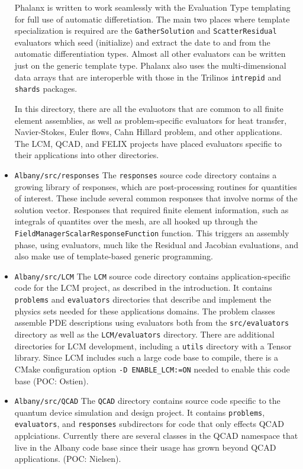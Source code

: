 \documentclass[pdf,12pt,report,strict]{SANDreport}
\theoremstyle{remark}
\begin{document}
\begin{itemize}
Phalanx is written to work seamlessly with the Evaluation Type templating for full
use of automatic differetiation. The main two places where template specialization is
required are the \texttt{GatherSolution} and \texttt{ScatterResidual} evaluators which
seed (initialize) and extract the date to and from the automatic differentiation types.
Almost all other evaluators can be written just on the generic template type.
Phalanx also uses the multi-dimensional data arrays that are interoperble with those in the
Trilinos \texttt{intrepid} and \texttt{shards} packages.

In this directory, there are all the evaluotors that are common to all finite element
assemblies, as well as problem-specific evaluators for heat transfer, Navier-Stokes, 
Euler flows, Cahn Hillard problem, and other applications. The LCM, QCAD, and
FELIX projects have placed evaluators specific to their applications into 
other directories.

\item{\texttt{Albany/src/responses}}  The \texttt{responses} source code directory contains
a growing library of responses, which are post-processing routines for quantities of interest.
These include several common responses that involve norms of the solution vector. 
Responses that required finite element information, such as integrals of quantites
over the mesh, are all hooked up through the
\texttt{FieldManagerScalarResponseFunction} function. This triggers an assembly
phase, using evaluators, much like the Residual and Jacobian evaluations, and 
also make use of template-based generic programming.

\item{\texttt{Albany/src/LCM}}  The \texttt{LCM} source code directory contains 
application-specific code for the LCM project, as described in the introduction. It contains
\texttt{problems} and \texttt{evaluators} directories that describe and implement
the physics sets needed for these applications domains. The problem classes assemble
PDE descriptions using evaluators both from the \texttt{src/evaluators} directory as
well as the \texttt{LCM/evaluators} directory. There are additional
directories for LCM development, including a \texttt{utils} directory with a Tensor
library. Since LCM includes such a large code base to compile, there is a CMake configuration 
option \texttt{-D ENABLE\_LCM:=ON} needed to enable this code base (POC: Ostien).

\item{\texttt{Albany/src/QCAD}}  The \texttt{QCAD} directory contains source code specific
to the quantum device simulation and design project. It contains \texttt{problems}, 
\texttt{evaluators}, and \texttt{responses} subdirectors for code that only effects
QCAD applciations. Currently there are several classes in the QCAD namespace that live
in the Albany code base since their usage has grown beyond QCAD applications.
(POC: Nielsen). 


\end{itemize}
\end{document}
